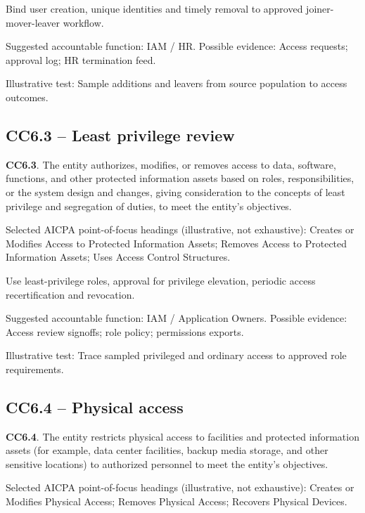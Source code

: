 \documentclass[10pt,oneside]{report}
\begin{document}
\begin{engineeringbox}
Bind user creation, unique identities and timely removal to approved joiner-mover-leaver workflow.
\end{engineeringbox}
Suggested accountable function: IAM / HR. Possible evidence: Access requests; approval log; HR termination feed.

Illustrative test: Sample additions and leavers from source population to access outcomes.

\subsection*{CC6.3 -- Least privilege review}
\begin{aicpabox}
\textbf{CC6.3}. The entity authorizes, modifies, or removes access to data, software, functions, and other protected information assets based on roles, responsibilities, or the system design and changes, giving consideration to the concepts of least privilege and segregation of duties, to meet the entity's objectives.\par{}
\end{aicpabox}
Selected AICPA point-of-focus headings (illustrative, not exhaustive): Creates or Modifies Access to Protected Information Assets; Removes Access to Protected Information Assets; Uses Access Control Structures.

\begin{engineeringbox}
Use least-privilege roles, approval for privilege elevation, periodic access recertification and revocation.
\end{engineeringbox}
Suggested accountable function: IAM / Application Owners. Possible evidence: Access review signoffs; role policy; permissions exports.

Illustrative test: Trace sampled privileged and ordinary access to approved role requirements.

\subsection*{CC6.4 -- Physical access}
\begin{aicpabox}
\textbf{CC6.4}. The entity restricts physical access to facilities and protected information assets (for example, data center facilities, backup media storage, and other sensitive locations) to authorized personnel to meet the entity's objectives.\par{}
\end{aicpabox}
Selected AICPA point-of-focus headings (illustrative, not exhaustive): Creates or Modifies Physical Access; Removes Physical Access; Recovers Physical Devices.
\end{document}
